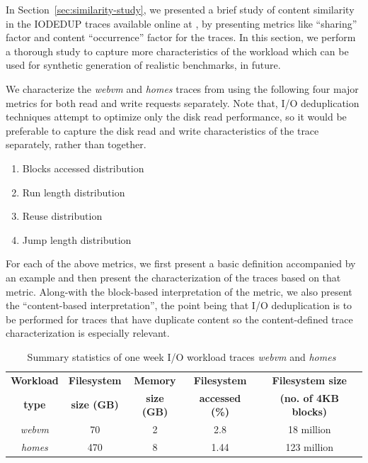 In Section~\ref{sec:similarity-study}, we presented a brief study
of content similarity in the IODEDUP traces available online 
at \cite{iodedup-online}, by presenting 
metrics like ``sharing'' factor and content ``occurrence'' factor
for the traces. In this section, we perform a thorough study
to capture more characteristics of the workload
which can be used for synthetic generation of realistic
benchmarks, in future.

We characterize the \textit{webvm} and \textit{homes} traces from \cite{iodedup-online}
using the following four major
metrics for both read and write requests separately. Note that, I/O
deduplication techniques attempt to optimize only the disk read performance,
so it would be preferable to capture the disk read and write characteristics
of the trace separately, rather than together. 
\begin{enumerate}
		\singlespacing
	\item Blocks accessed distribution
	\item Run length distribution
	\item Reuse distribution
	\item Jump length distribution
\end{enumerate}

For each of the above metrics, we first present a basic definition 
accompanied by an example and then present the characterization of the
traces based on that metric. Along-with the block-based interpretation of
the metric, we also present the ``content-based interpretation'', the point
being that I/O deduplication is to be performed for traces that have
duplicate content so the content-defined trace characterization is especially
relevant.

 \begin{table}[t]
 \caption{Summary statistics of one week I/O workload traces \textit{webvm} and \textit{homes}~\cite{iodedup}}
 \begin{center}
 \begin{tabular}{|c|c|c|c|c|} \hline
   \bf{Workload} & \bf{Filesystem} & \bf{Memory} & \bf{Filesystem} & \bf{Filesystem size} \\
  \bf{type} & \bf{size (GB)} & \bf{size (GB)} & \bf{accessed (\%)} & \bf{(no. of 4KB blocks)} \\ \hline
  \textit{webvm} & 70 & 2 & 2.8 & 18 million \\
  \textit{homes} & 470 & 8 & 1.44 & 123 million \\ \hline
 \end{tabular}
 \label{tab:tracechar-summary-stats}
 \end{center}
 \end{table}
 

